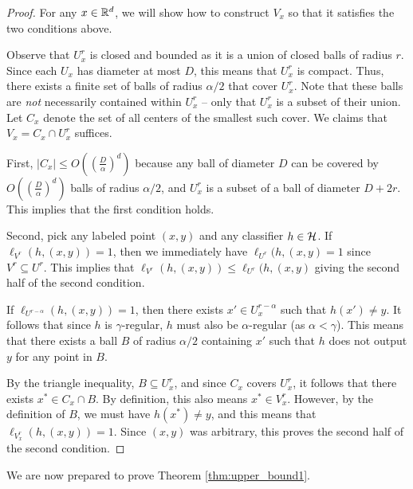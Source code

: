 \begin{proof}
For any $x \in \mathbb{R}^d$, we will show how to construct $V_x$ so that it satisfies the two conditions above.

Observe that $U_x^r$ is closed and bounded as it is a union of closed balls of radius $r$. Since each $U_x$ has diameter at most $D$, this means that $U_x^r$ is compact. Thus, there exists a finite set of balls of radius $\alpha/2$ that cover $U_x^r$. Note that these balls are \textit{not} necessarily contained within $U_x^r$ -- only that $U_x^r$ is a subset of their union. Let $C_x$ denote the set of all centers of the smallest such cover. We claims that $V_x = C_x \cap U_x^r$ suffices.

First, $|C_x| \leq O\left((\frac{D}{\alpha})^d\right)$ because any ball of diameter $D$ can be covered by $O\left((\frac{D}{\alpha})^d\right)$ balls of radius $\alpha/2$, and $U_x^r$ is a subset of a ball of diameter $D+2r$. This implies that the first condition holds.

Second, pick any labeled point $(x,y)$ and any classifier $h \in \mathcal H$. If $\ell_{V^r}(h, (x,y)) = 1$, then we immediately have $\ell_{U^r}(h, (x,y) = 1$ since $V^r \subseteq U^r$. This implies that $\ell_{V^r}(h, (x,y)) \leq \ell_{U^r}(h, (x,y)$ giving the second half of the second condition.   

If $\ell_{U^{r-\alpha}}(h, (x,y)) = 1$, then there exists $x' \in U_x^{r-\alpha}$ such that $h(x') \neq y$. It follows that since $h$ is $\gamma$-regular, $h$ must also be $\alpha$-regular (as $\alpha < \gamma$). This means that there exists a ball $B$ of radius $\alpha/2$ containing $x'$ such that $h$ does not output $y$ for any point in $B$. 

By the triangle inequality, $B \subseteq U_x^r$, and since $C_x$ covers $U_x^r$, it follows that there exists $x^* \in C_x \cap B$. By definition, this also means $x^* \in V_x^r$. However, by the definition of $B$, we must have $h(x^*) \neq y$, and this means that $\ell_{V_x^r}(h, (x,y)) = 1$. Since $(x,y)$ was arbitrary, this proves the second half of the second condition. 
\end{proof}

We are now prepared to prove Theorem \ref{thm:upper_bound1}.

